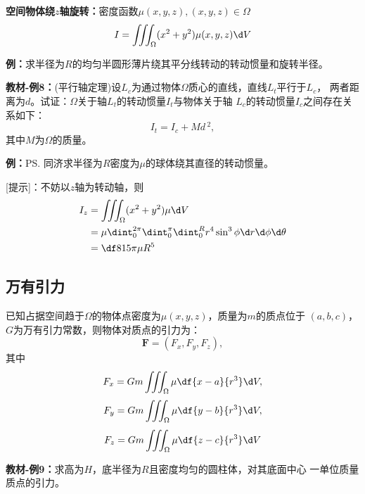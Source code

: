 {\bf 空间物体绕$z$轴旋转：}密度函数$\mu(x,y,z),(x,y,z)\in\Omega$
$${I=\iiint_{\Omega}(x^2+y^2)\mu(x,y,z)\d V}$$

{\bf 例：}求半径为$R$的均匀半圆形薄片绕其平分线转动的转动惯量和旋转半径。

{\bf 教材-例8：}(平行轴定理)设$L_c$为通过物体$\Omega$质心的直线，直线$L_t$平行于$L_c$，
两者距离为$d$。试证：$\Omega$关于轴$L_t$的转动惯量$I_t$与物体关于轴
$L_c$的转动惯量$I_c$之间存在关系如下：
$$I_t=I_c+Md\,^2,$$
其中$M$为$\Omega$的质量。

{\bf 例：}\ps{同济}求半径为$R$密度为$\mu$的球体绕其直径的转动惯量。

[提示]：不妨以$z$轴为转动轴，则
\begin{align*}
	I_z&=\iiint_{\Omega}(x^2+y^2)\mu\d V\\
	&=\mu\dint_0^{2\pi}\dint_0^{\pi}\dint_0^Rr^4\sin^3\phi\d r
	\d\phi\d\theta\\
	&=\df8{15}\pi\mu R^5
\end{align*}

\subsection{万有引力}

已知占据空间趋于$\Omega$的物体点密度为$\mu(x,y,z)$，质量为$m$的质点位于
$(a,b,c)$，$G$为万有引力常数，则物体对质点的引力为：
$$\bm{F}=(F_x,F_y,F_z),$$
其中
$${F_x=Gm\iiint_{\Omega}\mu\df{x-a}{r^3}\d V,} $$
$${F_y=Gm\iiint_{\Omega}\mu\df{y-b}{r^3}\d V,} $$
$${F_z=Gm\iiint_{\Omega}\mu\df{z-c}{r^3}\d V} $$

{\bf 教材-例9：}求高为$H$，底半径为$R$且密度均匀的圆柱体，对其底面中心
一单位质量质点的引力。

\begin{center}
\end{center}

